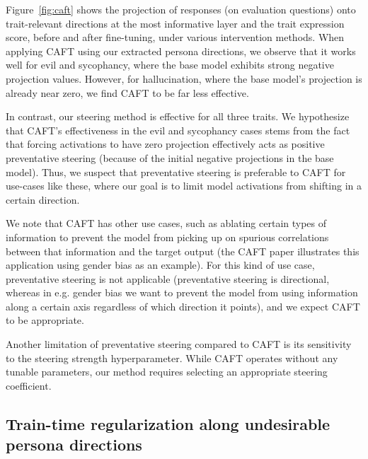 Figure~\ref{fig:caft} shows the projection of responses (on evaluation questions) onto trait-relevant directions at the most informative layer and the trait expression score, before and after fine-tuning, under various intervention methods. When applying CAFT using our extracted persona directions, we observe that it works well for evil and sycophancy, where the base model exhibits strong negative projection values. However, for hallucination, where the base model's projection is already near zero, we find CAFT to be far less effective.

In contrast, our steering method is effective for all three traits.
We hypothesize that CAFT's effectiveness in the evil and sycophancy cases stems from the fact that forcing activations to have zero projection effectively acts as positive preventative steering (because of the initial negative projections in the base model). 
Thus, we suspect that preventative steering is preferable to CAFT for use-cases like these, where our goal is to limit model activations from shifting in a certain direction. 

We note that CAFT has other use cases, such as ablating certain types of information to prevent the model from picking up on spurious correlations between that information and the target output (the CAFT paper illustrates this application using gender bias as an example). For this kind of use case, preventative steering is not applicable (preventative steering is directional, whereas in e.g. gender bias we want to prevent the model from using information along a certain axis regardless of which direction it points), and we expect CAFT to be appropriate. 

Another limitation of preventative steering compared to CAFT is its sensitivity to the steering strength hyperparameter. While CAFT operates without any tunable parameters, our method requires selecting an appropriate steering coefficient.

\subsection{Train-time regularization along undesirable persona directions} \label{appendix: reg}

